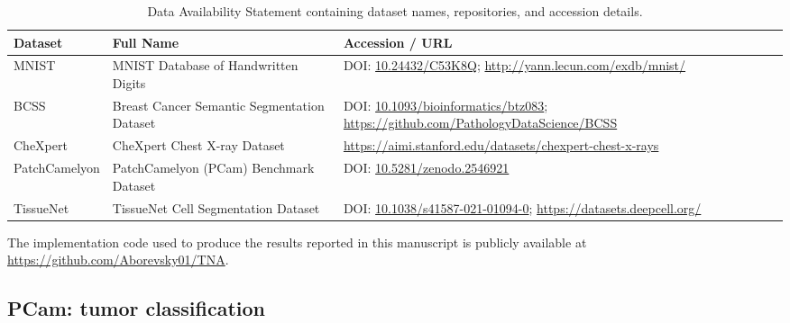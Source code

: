 \documentclass[10pt,letterpaper]{article}
\newcommand{\edit}[1]{#1} %
\begin{document}
\begin{table}[ht]
\centering
\small %
\caption{Data Availability Statement containing dataset names, repositories, and accession details.}
\label{tab:data_availability}
\begin{tabularx}{\textwidth}{@{}l>{\raggedright\arraybackslash}X>{\raggedright\arraybackslash}X@{}}
\toprule
\textbf{Dataset} & \textbf{Full Name} & \textbf{Accession / URL} \\
\midrule
MNIST & MNIST Database of Handwritten Digits &  DOI: \href{https://doi.org/10.24432/C53K8Q}{10.24432/C53K8Q}; \url{http://yann.lecun.com/exdb/mnist/} \\
\addlinespace
BCSS & Breast Cancer Semantic Segmentation Dataset &DOI: \href{https://doi.org/10.1093/bioinformatics/btz083}{10.1093/bioinformatics/btz083}; \url{https://github.com/PathologyDataScience/BCSS} \\
\addlinespace
CheXpert & CheXpert Chest X-ray Dataset & \url{https://aimi.stanford.edu/datasets/chexpert-chest-x-rays} \\
\addlinespace
PatchCamelyon & PatchCamelyon (PCam) Benchmark Dataset & DOI: \href{https://doi.org/10.5281/zenodo.2546921}{10.5281/zenodo.2546921} \\
\addlinespace
TissueNet & TissueNet Cell Segmentation Dataset & DOI: \href{https://doi.org/10.1038/s41587-021-01094-0}{10.1038/s41587-021-01094-0}; \url{https://datasets.deepcell.org/} \\
\bottomrule
\end{tabularx}
\end{table}

\edit{The implementation code used to produce the results reported in this manuscript is publicly available at \url{https://github.com/Aborevsky01/TNA}.}

\subsection*{PCam: tumor classification}
\end{document}
